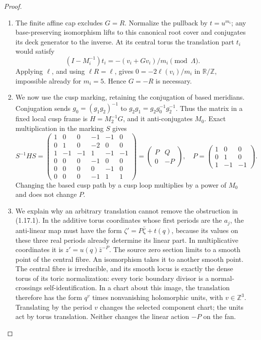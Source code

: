 \documentclass[11pt,a4paper]{article}
\theoremstyle{definition}
\begin{document}
\begin{proof}
\begin{enumerate}[label=\arabic*.]
\item The finite affine cap excludes $G=R$.  Normalize the pullback by
$t=u^{m_i}$; any base-preserving isomorphism lifts to this canonical
root cover and conjugates its deck generator to the inverse.
At its central torus the translation part $t_i$ would satisfy
\[
(I-M_i^{-1})t_i=-(v_i+Gv_i)/m_i\pmod\Lambda.
\]
Applying $\ell$, and using $\ell R=\ell$, gives
$0=-2\ell(v_i)/m_i$ in $\mathbb R/\mathbb Z$, impossible already
for $m_i=5$.  Hence $G=-R$ is necessary.

\item We now use the cusp marking, retaining the conjugation of based
meridians.  Conjugation sends
$g_0=(g_1g_2)^{-1}$ to $g_2g_1=g_2g_0^{-1}g_2^{-1}$.
Thus the matrix in a fixed local cusp frame is
$H=M_2^{-1}G$, and it anti-conjugates $M_0$.
Exact multiplication in the marking $S$ gives
\[
S^{-1}HS=
\begin{pmatrix}
1&0&0&-1&-1&0\\
0&1&0&-2&0&0\\
1&-1&-1&1&-1&-1\\
0&0&0&-1&0&0\\
0&0&0&0&-1&0\\
0&0&0&-1&1&1
\end{pmatrix}
=\begin{pmatrix}P&Q\\0&-P\end{pmatrix},\quad
P=\begin{pmatrix}1&0&0\\0&1&0\\1&-1&-1\end{pmatrix}.
\tag{1.17.1}
\]
Changing the based cusp path by a cusp loop multiplies by a power of
$M_0$ and does not change $P$.

\item We explain why an arbitrary translation cannot remove the obstruction
in (1.17.1).  In the additive torus coordinates whose first periods
are the $a_j$, the anti-linear map must have the form
$\zeta' =P\bar\zeta+t(q)$, because its values on these three real
periods already determine its linear part.  In multiplicative
coordinates it is
$z'=u(q)\bar z^{-P}$.
The source zero section limits to a smooth point of the central fibre.
An isomorphism takes it to another smooth point.  The central fibre
is irreducible, and its smooth locus is exactly the dense torus of
its toric normalization: every toric boundary divisor is a
normal-crossings self-identification.  In a chart about this image,
the translation therefore has the form $q^v$ times nonvanishing
holomorphic units, with $v\in\mathbb Z^3$.  Translating by the period
$v$ changes the selected component chart; the units act by torus
translation.  Neither changes the linear action $-P$ on the fan.


\end{enumerate}
\end{proof}
\end{document}

